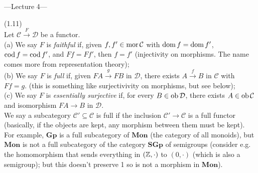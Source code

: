 \documentclass[a4paper]{article}
\begin{document}
---Lecture 4---

\begin{defi} (1.11)\\
    Let $\mathcal{C} \xrightarrow{F} \mathcal{D}$ be a functor.\\
    (a) We say $F$ is \emph{faithful} if, given $f,f' \in \operatorname{mor} \mathcal{C}$ with $\operatorname{dom} f = \operatorname{dom} f'$, $\operatorname{cod} f = \operatorname{cod} f'$, and $Ff = Ff'$, then $f=f'$ (injectivity on morphisms. The name comes more from representation theory);\\
    (b) We say $F$ is \emph{full} if, given $FA \xrightarrow{g} FB$ in $\mathcal{D}$, there exists $A \xrightarrow{f} B$ in $\mathcal{C}$ with $Ff = g$. (this is something like surjectivivity on morphisms, but see below);\\
    (c) We say  $F$ is \emph{essentially surjective} if, for every $B \in \operatorname{ob} \mathcal{D}$, there exists $A \in \operatorname{ob} \mathcal{C}$ and isomorphism $FA \to B$ in $\mathcal{D}$.\\
    We say a subcategory $\mathcal{C}' \subseteq \mathcal{C}$ is full if the inclusion $\mathcal{C}' \to \mathcal{C}$ is a full functor (basically, if the objects are kept, any morphism between them must be kept). For example, $\mathbf{Gp}$ is a full subcategory of $\mathbf{Mon}$ (the category of all monoids), but $\mathbf{Mon}$ is not a full subcategory of the category $\mathbf{SGp}$ of semigroups (consider e.g. the homomorphism that sends everything in $(\mathbb{Z},\cdot)$ to $(0,\cdot)$ (which is also a semigroup); but this doesn't preserve 1 so is not a morphism in $\mathbf{Mon}$).
\end{defi}
\end{document}
